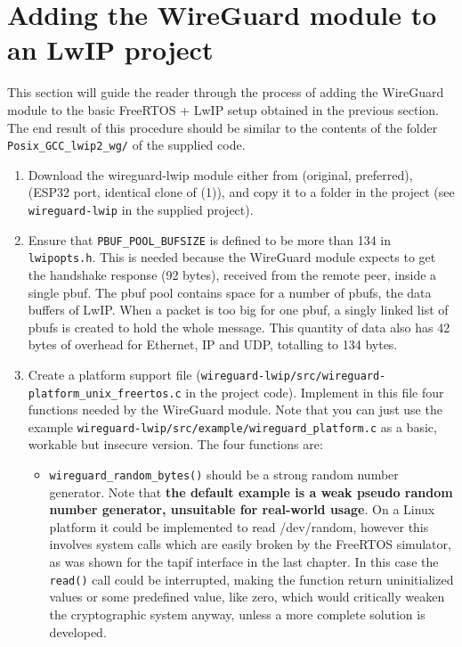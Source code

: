 \section{Adding the WireGuard module to an LwIP project}\label{sec:addwglinuxsection}
This section will guide the reader through the process of adding the WireGuard module to the basic FreeRTOS + LwIP setup obtained in the previous section.\\
The end result of this procedure should be similar to the contents of the folder \texttt{Posix\_GCC\_lwip2\_wg/} of the supplied code.
\begin{enumerate}
    \item Download the wireguard-lwip module either from \cite{wg_smartalock} (original, preferred), \cite{wg_trombik} (ESP32 port, identical clone of (1)), and copy it to a folder in the project (see \texttt{wireguard-lwip} in the supplied project).
    \item Ensure that \texttt{PBUF\_POOL\_BUFSIZE} is defined to be more than 134 in \texttt{lwipopts.h}. This is needed because the WireGuard module expects to get the handshake response (92 bytes), received from the remote peer, inside a single pbuf. The pbuf pool contains space for a number of pbufs, the data buffers of LwIP. When a packet is too big for one pbuf, a singly linked list of pbufs is created to hold the whole message. This quantity of data also has 42 bytes of overhead for Ethernet, IP and UDP, totalling to 134 bytes.
    \item Create a platform support file (\texttt{wireguard-lwip/src/wireguard-platform\_unix\_freertos.c} in the project code). Implement in this file four functions needed by the WireGuard module. Note that you can just use the example \texttt{wireguard-lwip/src/example/wireguard\_platform.c} as a basic, workable but insecure version.
    The four functions are:
    \begin{itemize}
        \item \texttt{wireguard\_random\_bytes()} should be a strong random number generator. Note that \textbf{the default example is a weak pseudo random number generator, unsuitable for real-world usage}. On a Linux platform it could be implemented to read /dev/random, however this involves system calls which are easily broken by the FreeRTOS simulator, as was shown for the tapif interface in the last chapter. In this case the \texttt{read()} call could be interrupted, making the function return uninitialized values or some predefined value, like zero, which would critically weaken the cryptographic system anyway, unless a more complete solution is developed.

\end{itemize}
\end{enumerate}

